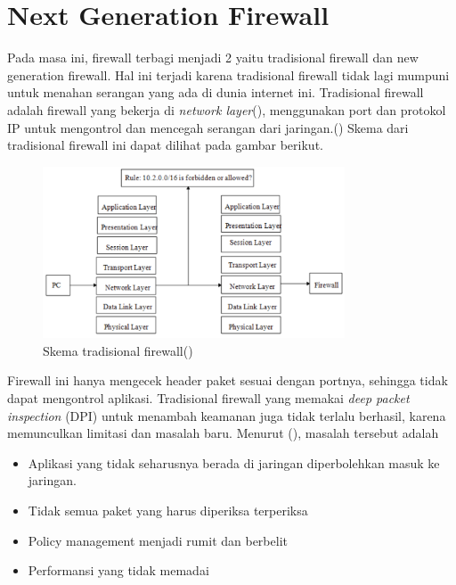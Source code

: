 \section{Next Generation Firewall}
Pada masa ini, firewall terbagi menjadi 2 yaitu tradisional firewall dan new generation firewall. Hal ini terjadi karena tradisional firewall tidak lagi mumpuni untuk menahan serangan yang ada di dunia internet ini. 
Tradisional firewall adalah firewall yang bekerja di \textit{network layer}(\cite{nicoll2004challenges}), menggunakan port dan protokol IP untuk mengontrol dan mencegah serangan dari jaringan.(\cite{zhong2012design}) Skema dari tradisional firewall ini dapat dilihat pada gambar berikut.
\begin{figure}[H]
	\centering
	\includegraphics[width=0.8\textwidth]{resources/tradisional_firewall.png}
	\caption{Skema tradisional firewall(\cite{zhong2012design})}
	\label{fig:tradisional_firewall}
\end{figure}

Firewall ini hanya mengecek header paket sesuai dengan portnya, sehingga tidak dapat mengontrol aplikasi. Tradisional firewall yang memakai \textit{deep packet inspection} (DPI) untuk menambah keamanan juga tidak terlalu berhasil, karena memunculkan limitasi dan masalah baru. Menurut (\cite{miller2011next}), masalah tersebut adalah
\begin{itemize}
	\item Aplikasi yang tidak seharusnya berada di jaringan diperbolehkan masuk ke jaringan.
	\item Tidak semua paket yang harus diperiksa terperiksa
	\item Policy management menjadi rumit dan berbelit
	\item Performansi yang tidak memadai 
\end{itemize}

